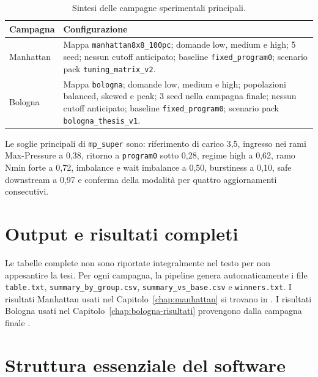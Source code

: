 \documentclass[12pt,a4paper,oneside]{report}
\numberwithin{equation}{chapter}
\begin{document}
\begin{table}[htbp]
    \centering
    \small
    \caption{Sintesi delle campagne sperimentali principali.}
    \label{tab:appendice-campagne}
    \begin{tabularx}{\textwidth}{lX}
        \toprule
        Campagna & Configurazione \\
        \midrule
        Manhattan &
        Mappa \texttt{manhattan8x8\_100pc}; domande low, medium e high;
        5 seed; nessun cutoff anticipato; baseline
        \texttt{fixed\_program0}; scenario pack \texttt{tuning\_matrix\_v2}. \\
        Bologna &
        Mappa \texttt{bologna}; domande low, medium e high; popolazioni
        balanced, skewed e peak; 3 seed nella campagna finale; nessun cutoff
        anticipato; baseline \texttt{fixed\_program0}; scenario pack
        \texttt{bologna\_thesis\_v1}. \\
        \bottomrule
    \end{tabularx}
\end{table}

Le soglie principali di \texttt{mp\_super} sono: riferimento di carico 3,5,
ingresso nei rami Max-Pressure a 0,38, ritorno a \texttt{program0} sotto 0,28,
regime high a 0,62, ramo Nmin forte a 0,72, imbalance e wait imbalance a 0,50,
burstiness a 0,10, safe downstream a 0,97 e conferma della modalità per
quattro aggiornamenti consecutivi.

\section{Output e risultati completi}
\label{app:risultati}

Le tabelle complete non sono riportate integralmente nel testo per non
appesantire la tesi. Per ogni campagna, la pipeline genera automaticamente i
file \texttt{table.txt}, \texttt{summary\_by\_group.csv},
\texttt{summary\_vs\_base.csv} e \texttt{winners.txt}. I risultati Manhattan
usati nel Capitolo~\ref{chap:manhattan} si trovano in
. I risultati Bologna usati
nel Capitolo~\ref{chap:bologna-risultati} provengono dalla campagna finale
.

\section{Struttura essenziale del software}
\label{app:software}
\end{document}
